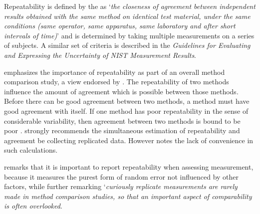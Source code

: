 \documentclass[12pt, a4paper]{report}
\theoremstyle{plain}
\theoremstyle{definition}
\theoremstyle{remark}
\begin{document}
		Repeatability is defined by the \citet{IUPAC} as `\textit{the closeness of agreement between independent results obtained with the same method on identical test material, under the same conditions (same
			operator, same apparatus, same laboratory and after short intervals of time)}'  and is determined by taking multiple measurements on a series of subjects.	A similar set of criteria is described in the \textit{Guidelines for Evaluating and Expressing the Uncertainty of NIST Measurement Results}.
%		



\citet{Barnhart} emphasizes the importance of repeatability as part of an overall method comparison study, a view endorsed by \citet{BXC2008}. The repeatability of two methods influence the amount of agreement which is possible between those methods. Before there can be good agreement between two methods, a method must have good agreement with itself. If one method has poor repeatability in the sense of considerable variability, then agreement between two methods is bound to be poor \citep{BA99, ARoy2009}.
\citet{BA99} strongly recommends the simultaneous estimation of repeatability and agreement be collecting replicated data.
However \citet{ARoy2009} notes the lack of convenience in such calculations. 

% 

	

	\citet{Barnhart} remarks that it is important to report repeatability when assessing
	measurement, because it measures the purest form of random error
	not influenced by other factors, while further remarking `\textit{curiously replicate measurements are rarely made in method comparison studies, so that an important aspect of comparability is often overlooked}. 
	
\end{document}
